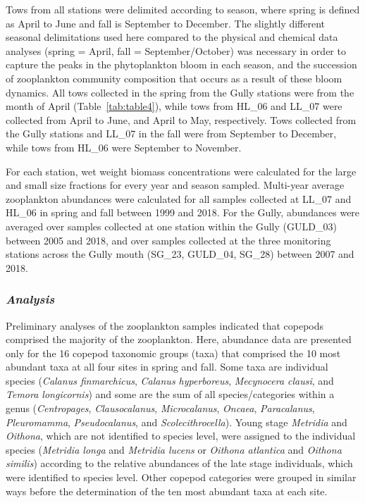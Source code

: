 \documentclass[12pt]{article}\usepackage[]{graphicx}\usepackage[]{color}
\begin{document}
Tows from all stations were delimited according to season, where spring is defined as April to June and fall is September to December. The slightly different seasonal delimitations used here compared to the physical and chemical data analyses (spring = April, fall = September/October) was necessary in order to capture the peaks in the phytoplankton bloom in each season, and the succession of zooplankton community composition that occurs as a result of these bloom dynamics. All tows collected in the spring from the Gully stations were from the month of April (Table~\ref{tab:table4}), while tows from HL\_06 and LL\_07 were collected from April to June, and April to May, respectively. Tows collected from the Gully stations and LL\_07 in the fall were from September to December, while tows from HL\_06 were September to November.

For each station, wet weight biomass concentrations were calculated for the large and small size fractions for every year and season sampled. Multi-year average zooplankton abundances were calculated for all samples collected at LL\_07 and HL\_06 in spring and fall between 1999 and 2018. For the Gully, abundances were averaged over samples collected at one station within the Gully (GULD\_03) between 2005 and 2018, and over samples collected at the three monitoring stations across the Gully mouth (SG\_23, GULD\_04, SG\_28) between 2007 and 2018.

\hypertarget{analysis-2}{%
\subsubsection{\texorpdfstring{\emph{Analysis}}{Analysis}}\label{analysis-2}}

Preliminary analyses of the zooplankton samples indicated that copepods comprised the majority of the zooplankton. Here, abundance data are presented only for the 16 copepod taxonomic groups (taxa) that comprised the 10 most abundant taxa at all four sites in spring and fall. Some taxa are individual species (\emph{Calanus finmarchicus}, \emph{Calanus hyperboreus}, \emph{Mecynocera clausi}, and \emph{Temora longicornis}) and some are the sum of all species/categories within a genus (\emph{Centropages}, \emph{Clausocalanus}, \emph{Microcalanus}, \emph{Oncaea}, \emph{Paracalanus}, \emph{Pleuromamma}, \emph{Pseudocalanus}, and \emph{Scolecithrocella}). Young stage \emph{Metridia} and \emph{Oithona}, which are not identified to species level, were assigned to the individual species (\emph{Metridia longa} and \emph{Metridia lucens} or \emph{Oithona atlantica} and \emph{Oithona similis}) according to the relative abundances of the late stage individuals, which were identified to species level. Other copepod categories were grouped in similar ways before the determination of the ten most abundant taxa at each site.
\end{document}
